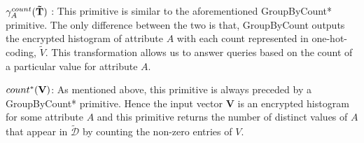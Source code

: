  $\gamma^{count}_{A}(\mathbf{\tilde{T}})$ : This primitive is similar to the aforementioned \textsf{GroupByCount*} primitive. The only difference between the two is that, \textsf{GroupByCount} outputs the encrypted histogram of attribute $A$ with each count represented in one-hot-coding, $\tilde{V}$.  This transformation allows us to answer queries based on the count of a particular value for attribute $A$.

$count^*(\mathbf{V})$: As mentioned above, this primitive is always preceded by a \textsf{GroupByCount*} primitive. Hence the input vector $\mathbf{V}$ is an encrypted histogram for some attribute $A$ and this primitive returns the number of distinct values of $A$ that appear in  $\boldsymbol{\tilde{\mathcal{D}}}$ by counting the non-zero entries of $V$.



